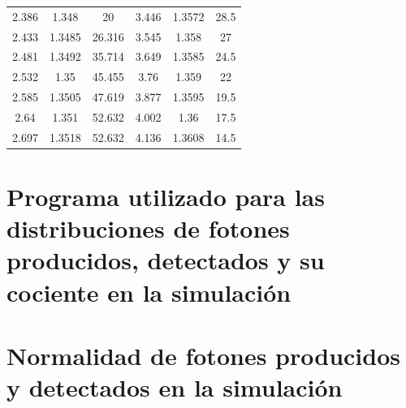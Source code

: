 \documentclass{book}
\begin{document}
\begin{table}[h]
\begin{tabular}{c c c | c c c}
2.386                     & 1.348                    & 20                        & 3.446                     & 1.3572                   & 28.5                      \\
2.433                     & 1.3485                   & 26.316                    & 3.545                     & 1.358                    & 27                        \\
2.481                     & 1.3492                   & 35.714                    & 3.649                     & 1.3585                   & 24.5                      \\
2.532                     & 1.35                     & 45.455                    & 3.76                      & 1.359                    & 22                        \\
2.585                     & 1.3505                   & 47.619                    & 3.877                     & 1.3595                   & 19.5                      \\
2.64                      & 1.351                    & 52.632                    & 4.002                     & 1.36                     & 17.5                      \\
2.697                     & 1.3518                   & 52.632                    & 4.136                     & 1.3608                   & 14.5 \\

 \hline
\hline

\hline
\end{tabular}
\end{table}

\pagebreak
\section{Programa utilizado para las distribuciones de fotones producidos, detectados y su cociente en la simulaci\'on}



\pagebreak
\section{Normalidad de fotones producidos y detectados en la simulaci\'on}
\end{document}
